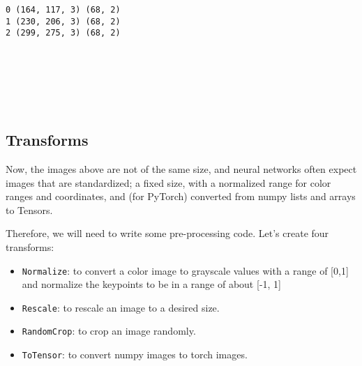 \documentclass[11pt]{article}
\providecommand{\tightlist}{%
      \setlength{\itemsep}{0pt}\setlength{\parskip}{0pt}}
\begin{document}
    \begin{Verbatim}[commandchars=\\\{\}]
0 (164, 117, 3) (68, 2)
1 (230, 206, 3) (68, 2)
2 (299, 275, 3) (68, 2)

    \end{Verbatim}

    \begin{center}
    \end{center}
    { \hspace*{\fill} \\}
    
    \begin{center}
    \end{center}
    { \hspace*{\fill} \\}
    
    \begin{center}
    \end{center}
    { \hspace*{\fill} \\}
    
    \subsection{Transforms}\label{transforms}

Now, the images above are not of the same size, and neural networks
often expect images that are standardized; a fixed size, with a
normalized range for color ranges and coordinates, and (for PyTorch)
converted from numpy lists and arrays to Tensors.

Therefore, we will need to write some pre-processing code. Let's create
four transforms:

\begin{itemize}
\tightlist
\item
  \texttt{Normalize}: to convert a color image to grayscale values with
  a range of {[}0,1{]} and normalize the keypoints to be in a range of
  about {[}-1, 1{]}
\item
  \texttt{Rescale}: to rescale an image to a desired size.
\item
  \texttt{RandomCrop}: to crop an image randomly.
\item
  \texttt{ToTensor}: to convert numpy images to torch images.
\end{itemize}
\end{document}
